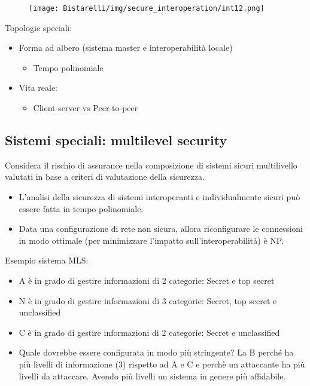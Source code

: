 \begin{figure}[H]
	\centering
    \texttt{[image: Bistarelli/img/secure\_interoperation/int12.png]}
\end{figure}

Topologie speciali:
\begin{itemize}
    \item Forma ad albero (sistema master e interoperabilità locale)
    
    \begin{itemize}
        \item Tempo polinomiale
    \end{itemize}
    
    \item Vita reale:
    
    \begin{itemize}
        \item Client-server vs Peer-to-peer
    \end{itemize}
\end{itemize}
\subsection{Sistemi speciali: multilevel security}
Considera il rischio di assurance nella composizione di sistemi sicuri multilivello valutati in base a criteri di
valutazione della sicurezza.
\begin{itemize}
    \item L'analisi della sicurezza di sistemi interoperanti e individualmente sicuri può essere fatta in tempo polinomiale.
    
    \item Data una configurazione di rete non sicura, allora riconfigurare le connessioni in modo ottimale (per minimizzare l'impatto sull'interoperabilità) è NP.
\end{itemize}
Esempio sistema MLS:
\begin{itemize}
    \item A è in grado di gestire informazioni di 2 categorie: Secret e top secret
    
    \item N è in grado di gestire informazioni di 3 categorie: Secret, top secret e unclassified
    
    \item C è in grado di gestire informazioni di 2 categorie: Secret e unclassified
    
    \item Quale dovrebbe essere configurata in modo più stringente? La B perché ha più livelli di informazione (3) rispetto ad A e C e perchè un attaccante ha più livelli da attaccare. Avendo più livelli un sistema in genere più affidabile.
\end{itemize}

